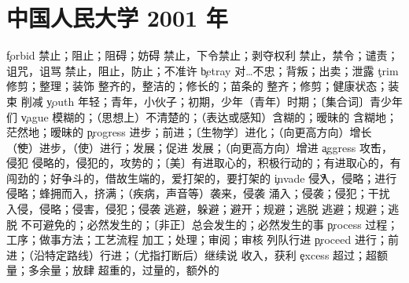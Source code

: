 \section{中国人民大学 2001 年}
\begin{multicols}{2}
\c{forbid}  \vt 禁止；阻止；阻碍；妨碍
  \vt 禁止，下令禁止；剥夺权利 \n 禁止，禁令；谴责；诅咒，诅骂
  \vt 禁止，阻止，防止；不准许
\c{betray}  \vt 对…不忠；背叛；出卖；泄露
\c{trim}  \vt 修剪；整理；装饰 \a 整齐的，整洁的；修长的；苗条的 \n 整齐；修剪；健康状态；装束 \vi 削减
\c{youth}  \n 年轻；青年，小伙子；初期，少年（青年）时期；〔集合词〕青少年们
\c{vague}  \a 模糊的；（思想上）不清楚的；（表达或感知）含糊的；暧昧的
  \ad 含糊地；茫然地；暧昧的
\c{progress}  \n 进步；前进；〔生物学〕进化；（向更高方向）增长 \v （使）进步，（使）进行；发展；促进 \vi 发展；（向更高方向）增进
\c{aggress}  \v 攻击，侵犯
  \a 侵略的，侵犯的，攻势的；〔美〕有进取心的，积极行动的；有进取心的，有闯劲的；好争斗的，借故生端的，爱打架的，要打架的
\c{invade}  \v 侵入，侵略；进行侵略；蜂拥而入，挤满；（疾病，声音等）袭来，侵袭 \vt 涌入；侵袭；侵犯；干扰
  \n 入侵，侵略；侵害，侵犯；侵袭
  \vt 逃避，躲避；避开；规避；逃脱 \vi 逃避；规避；逃脱
  \a 不可避免的；必然发生的；〔非正〕总会发生的；必然发生的事
\c{process}  \n 过程；工序；做事方法；工艺流程  \vt 加工；处理；审阅；审核 \vi 列队行进
\c{proceed}  \vi 进行；前进；（沿特定路线）行进；（尤指打断后）继续说 \n 收入，获利
\c{excess}  \n 超过；超额量；多余量；放肆  \a 超重的，过量的，额外的

\end{multicols}
